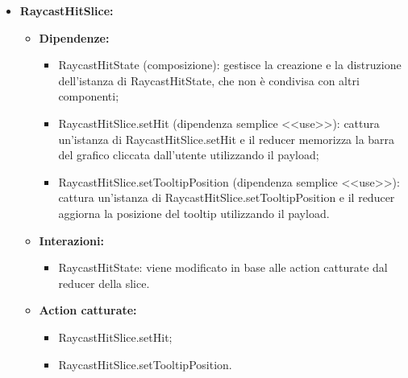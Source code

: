 \begin{itemize}
    \item \textbf{RaycastHitSlice:}
          \begin{itemize}
              \item \textbf{Dipendenze:}
                    \begin{itemize}
                        \item RaycastHitState (composizione): gestisce la creazione e la distruzione
                              dell'istanza di RaycastHitState, che non è condivisa con altri componenti;
                        \item RaycastHitSlice.setHit (dipendenza semplice <<use>>): cattura un'istanza di
                              RaycastHitSlice.setHit e il reducer memorizza la barra del grafico cliccata
                              dall'utente utilizzando il payload;
                        \item RaycastHitSlice.setTooltipPosition (dipendenza semplice <<use>>): cattura
                              un'istanza di RaycastHitSlice.setTooltipPosition e il reducer aggiorna la
                              posizione del tooltip utilizzando il payload.
                    \end{itemize}
              \item \textbf{Interazioni:}
                    \begin{itemize}
                        \item RaycastHitState: viene modificato in base alle action catturate dal reducer
                              della slice.
                    \end{itemize}
              \item \textbf{Action catturate:}
                    \begin{itemize}
                        \item RaycastHitSlice.setHit;
                        \item RaycastHitSlice.setTooltipPosition.
                    \end{itemize}
          \end{itemize}


\end{itemize}
